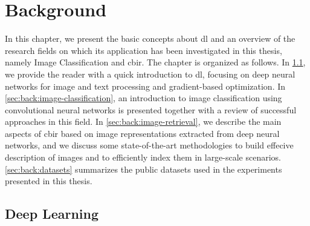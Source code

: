 
\def\x{\mathbf{x}} %
\def\X{\mathbf{X}} %

\def\y{\mathbf{y}} %
\def\Y{\mathbf{Y}} %

\def\w{\mathbf{w}} %
\def\W{\mathbf{W}} %
\def\b{\mathbf{b}} %

\def\h{\mathbf{h}} %

\def\i{\mathbf{i}} %
\def\f{\mathbf{f}} %
\def\o{\mathbf{o}} %
\def\u{\mathbf{u}} %
\def\c{\mathbf{c}} %

\def\R{\mathbb{R}} %
\def\L{\mathcal{L}} %
\def\a{\varphi} %

\def\({\left (} %
\def\){\right )} %


\chapter{Background}
\label{ch:background}

In this chapter, we present the basic concepts about \gls{dl} and an overview of the research fields on which its application has been investigated in this thesis, namely Image Classification and \gls{cbir}.
The chapter is organized as follows.
In \ref{sec:back:deep-learning}, we provide the reader with a quick introduction to \gls{dl}, focusing on deep neural networks for image and text processing and gradient-based optimization.
In \ref{sec:back:image-classification}, an introduction to image classification using convolutional neural networks is presented together with a review of successful approaches in this field.
In \ref{sec:back:image-retrieval}, we describe the main aspects of \gls{cbir} based on image representations extracted from deep neural networks, and we discuss some state-of-the-art methodologies to build effecive description of images and to efficiently index them in large-scale scenarios.
\ref{sec:back:datasets} summarizes the public datasets used in the experiments presented in this thesis.


\section{Deep Learning}
\label{sec:back:deep-learning}

